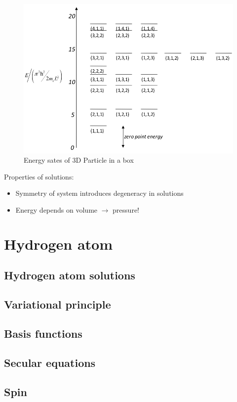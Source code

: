 \documentclass[11pt]{article}
\begin{document}
\begin{figure}[htb]
\centering
\includegraphics[width=.9\linewidth]{./Images/3DEnergyStates.png}
\caption{Energy sates of 3D Particle in a box}
\end{figure}

Properties of solutions:
\begin{itemize}
\item Symmetry of system introduces degeneracy in solutions
\item Energy depends on volume $\rightarrow$ pressure!
\end{itemize}

\newpage

\section{Hydrogen atom}
\label{sec-3}
\subsection{Hydrogen atom solutions}
\label{sec-3-1}
\subsection{Variational principle}
\label{sec-3-2}
\subsection{Basis functions}
\label{sec-3-3}
\subsection{Secular equations}
\label{sec-3-4}
\subsection{Spin}
\label{sec-3-5}
\newpage
\end{document}
